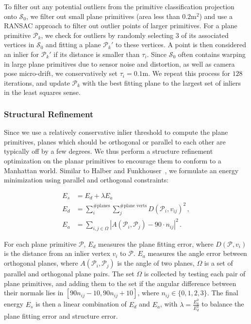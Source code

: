To filter out any potential outliers from the primitive classification projection onto $\mathcal{S}_0$, we filter out small plane primitives (area less than $0.2$m$^2$) and use a RANSAC approach to filter out outlier points of larger primitives.
For a plane primitive $\mathcal{P}_k$, we check for outliers by randomly selecting $3$ of its associated vertices in $\mathcal{S}_0$ and fitting a plane $\mathcal{P}_k'$ to these vertices. 
A point is then considered an inlier for $\mathcal{P}_k'$ if its distance is smaller than $\tau_i$. 
Since $\mathcal{S}_0$ often contains warping in large plane primitives due to sensor noise and distortion, as well as camera pose micro-drift, we conservatively set $\tau_i = 0.1$m.
We repeat this process for $128$ iterations, and update $\mathcal{P}_k$ with the best fitting plane to the largest set of inliers in the least squares sense.

\subsubsection{Structural Refinement}
\label{sec:fit-refine}

Since we use a relatively conservative inlier threshold to compute the plane primitives, planes which should be orthogonal or parallel to each other are typically off by a few degrees.
We thus perform a structure refinement optimization on the planar primitives to encourage them to conform to a Manhattan world.
Similar to Halber and Funkhouser~\cite{halber2016fine}, we formulate an energy minimization using parallel and orthogonal constraints:

\begin{align}
	E_s &= E_d + \lambda E_a\, \\
    E_d &= \sum_{i}^{\#\textrm{planes}} \sum_{j}^{\#\textrm{plane verts}} D(\mathcal{P}_i,v_{ij})^2\,,\\
    E_a &= \sum_{i,j\in \Omega} |A(\mathcal{P}_i,\mathcal{P}_j)-90\cdot n_{ij}|^2\,.
\end{align}

For each plane primitive $\mathcal{P}$, $E_d$ measures the plane fitting error, where $D(\mathcal{P},v_i)$ is the distance from an inlier vertex $v_i$ to $\mathcal{P}$. 
$E_a$ measures the angle error between orthogonal planes, where $A(\mathcal{P}_i,\mathcal{P}_j)$ is the angle of two planes, $\Omega$ is a set of parallel and orthogonal plane pairs. 
The set $\Omega$ is collected by testing each pair of plane primitives, and adding them to the set if the angular difference between their normals lies in $[90n_{ij}-10, 90n_{ij}+10]$, where $n_{ij}\in \{0,1,2,3\}$. 
The final energy $E_s$ is then a linear combination of $E_d$ and $E_a$, with $\lambda=\frac{E_a^0}{E_d^0}$ to balance the plane fitting error and structure error.

